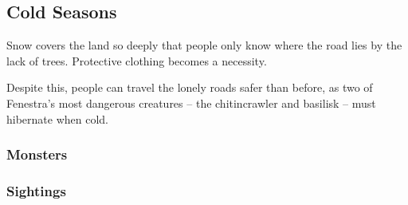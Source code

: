 \bigLine
\begin{multicols}{2}

\subsection{Cold Seasons}

Snow covers the land so deeply that people only know where the road lies by the lack of trees.
Protective clothing becomes a necessity.

Despite this, people can travel the lonely roads safer than before, as two of Fenestra's most dangerous creatures -- the chitincrawler and basilisk -- must hibernate when cold.

\encColdVillages

\encColdEdge

\encColdForest

\subsubsection*{Monsters}

\begin{multicols}{2}
\setcounter{enc}{1}
\begin{dlist}
\end{dlist}

\subsubsection*{Sightings}

\setcounter{track}{1}
\begin{dlist}
\end{dlist}

\end{multicols}

\end{multicols}

\bigLine

